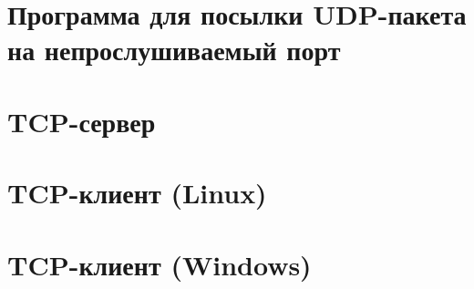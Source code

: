 \begin{append}

	\section{Программа для посылки UDP-пакета на непрослушиваемый порт} \label{app:udp}

	

	\section{TCP-сервер} \label{app:server}

	

	\section{TCP-клиент (Linux)} \label{app:client}

	

	\section{TCP-клиент (Windows)} \label{app:port}

	

\end{append}